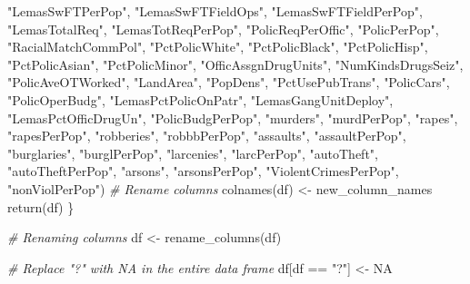 \documentclass[
  11pt,
]{article}
\newenvironment{Shaded}{}{}
\newcommand{\CommentTok}[1]{\textcolor[rgb]{0.38,0.63,0.69}{\textit{#1}}}
\newcommand{\ConstantTok}[1]{\textcolor[rgb]{0.53,0.00,0.00}{#1}}
\newcommand{\FunctionTok}[1]{\textcolor[rgb]{0.02,0.16,0.49}{#1}}
\newcommand{\NormalTok}[1]{#1}
\newcommand{\OtherTok}[1]{\textcolor[rgb]{0.00,0.44,0.13}{#1}}
\newcommand{\SpecialCharTok}[1]{\textcolor[rgb]{0.25,0.44,0.63}{#1}}
\newcommand{\StringTok}[1]{\textcolor[rgb]{0.25,0.44,0.63}{#1}}
\begin{document}
\begin{Shaded}
\begin{Highlighting}[]
                        \StringTok{"LemasSwFTPerPop"}\NormalTok{, }\StringTok{"LemasSwFTFieldOps"}\NormalTok{, }\StringTok{"LemasSwFTFieldPerPop"}\NormalTok{, }
                        \StringTok{"LemasTotalReq"}\NormalTok{, }\StringTok{"LemasTotReqPerPop"}\NormalTok{, }\StringTok{"PolicReqPerOffic"}\NormalTok{,}
                        \StringTok{"PolicPerPop"}\NormalTok{, }\StringTok{"RacialMatchCommPol"}\NormalTok{, }\StringTok{"PctPolicWhite"}\NormalTok{, }
                        \StringTok{"PctPolicBlack"}\NormalTok{, }\StringTok{"PctPolicHisp"}\NormalTok{, }\StringTok{"PctPolicAsian"}\NormalTok{, }\StringTok{"PctPolicMinor"}\NormalTok{, }
                        \StringTok{"OfficAssgnDrugUnits"}\NormalTok{, }\StringTok{"NumKindsDrugsSeiz"}\NormalTok{, }\StringTok{"PolicAveOTWorked"}\NormalTok{, }
                        \StringTok{"LandArea"}\NormalTok{, }\StringTok{"PopDens"}\NormalTok{, }\StringTok{"PctUsePubTrans"}\NormalTok{, }\StringTok{"PolicCars"}\NormalTok{, }
                        \StringTok{"PolicOperBudg"}\NormalTok{, }\StringTok{"LemasPctPolicOnPatr"}\NormalTok{, }\StringTok{"LemasGangUnitDeploy"}\NormalTok{, }
                        \StringTok{"LemasPctOfficDrugUn"}\NormalTok{, }\StringTok{"PolicBudgPerPop"}\NormalTok{, }\StringTok{"murders"}\NormalTok{, }\StringTok{"murdPerPop"}\NormalTok{, }
                        \StringTok{"rapes"}\NormalTok{, }\StringTok{"rapesPerPop"}\NormalTok{, }\StringTok{"robberies"}\NormalTok{, }\StringTok{"robbbPerPop"}\NormalTok{, }\StringTok{"assaults"}\NormalTok{,}
                        \StringTok{"assaultPerPop"}\NormalTok{, }\StringTok{"burglaries"}\NormalTok{, }\StringTok{"burglPerPop"}\NormalTok{, }\StringTok{"larcenies"}\NormalTok{, }
                        \StringTok{"larcPerPop"}\NormalTok{, }\StringTok{"autoTheft"}\NormalTok{, }\StringTok{"autoTheftPerPop"}\NormalTok{, }\StringTok{"arsons"}\NormalTok{, }
                        \StringTok{"arsonsPerPop"}\NormalTok{, }\StringTok{"ViolentCrimesPerPop"}\NormalTok{, }\StringTok{"nonViolPerPop"}\NormalTok{)}
  \CommentTok{\# Rename columns}
  \FunctionTok{colnames}\NormalTok{(df) }\OtherTok{\textless{}{-}}\NormalTok{ new\_column\_names}
  \FunctionTok{return}\NormalTok{(df)}
\NormalTok{\}}

\CommentTok{\# Renaming columns}
\NormalTok{df }\OtherTok{\textless{}{-}} \FunctionTok{rename\_columns}\NormalTok{(df)}

\CommentTok{\# Replace "?" with NA in the entire data frame}
\NormalTok{df[df }\SpecialCharTok{==} \StringTok{"?"}\NormalTok{] }\OtherTok{\textless{}{-}} \ConstantTok{NA}


\end{Highlighting}
\end{Shaded}
\end{document}
